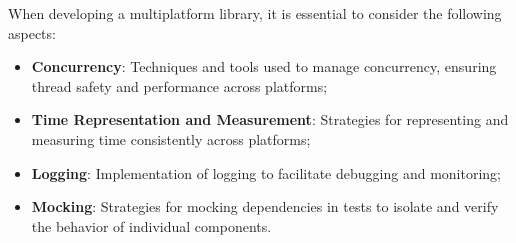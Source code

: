 When developing a multiplatform library, it is essential to consider the following aspects:

\begin{itemize}
    \item \textbf{Concurrency}: Techniques and tools used to manage concurrency, ensuring thread safety and performance across platforms;
    \item \textbf{Time Representation and Measurement}: Strategies for representing and measuring time consistently across platforms;
    \item \textbf{Logging}: Implementation of logging to facilitate debugging and monitoring;
    \item \textbf{Mocking}: Strategies for mocking dependencies in tests to isolate and verify the behavior of individual components.
\end{itemize}
